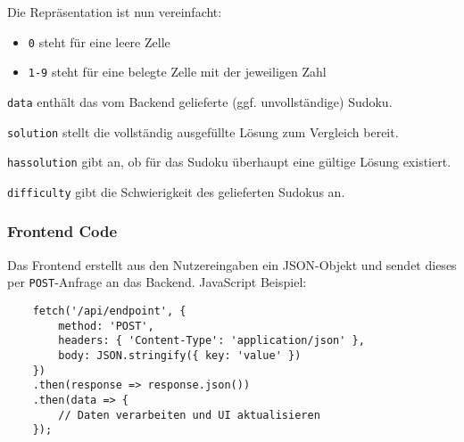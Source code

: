 Die Repräsentation ist nun vereinfacht:
\begin{itemize}
	\item \texttt{0} steht für eine leere Zelle
	\item \texttt{1-9} steht für eine belegte Zelle mit der jeweiligen Zahl
\end{itemize}

\texttt{data} enthält das vom Backend gelieferte (ggf. unvollständige) Sudoku. 

\texttt{solution} stellt die vollständig ausgefüllte Lösung zum Vergleich bereit.  

\texttt{hassolution} gibt an, ob für das Sudoku überhaupt eine gültige Lösung existiert.

\texttt{difficulty} gibt die Schwierigkeit des gelieferten Sudokus an.


\subsubsection{Frontend Code}
Das Frontend erstellt aus den Nutzereingaben ein JSON-Objekt und sendet dieses per \texttt{POST}-Anfrage an das Backend. JavaScript Beispiel:

\begin{verbatim}
	fetch('/api/endpoint', {
		method: 'POST',
		headers: { 'Content-Type': 'application/json' },
		body: JSON.stringify({ key: 'value' })
	})
	.then(response => response.json())
	.then(data => {
		// Daten verarbeiten und UI aktualisieren
	});
\end{verbatim}